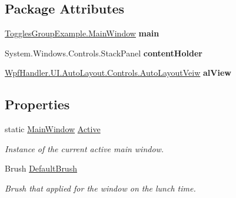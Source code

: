 \subsection*{Package Attributes}
\begin{DoxyCompactItemize}
\item 
\mbox{\label{class_toggles_group_example_1_1_main_window_a460c18e30b55048a9e354ff76a9f343e}} 
\mbox{\hyperlink{class_toggles_group_example_1_1_main_window}{Toggles\+Group\+Example.\+Main\+Window}} {\bfseries main}
\item 
\mbox{\label{class_toggles_group_example_1_1_main_window_ad2a198956555df9d157bc536853b8b8f}} 
System.\+Windows.\+Controls.\+Stack\+Panel {\bfseries content\+Holder}
\item 
\mbox{\label{class_toggles_group_example_1_1_main_window_af18d33079f92ae90c46e6f7fe9e27522}} 
\mbox{\hyperlink{class_wpf_handler_1_1_u_i_1_1_auto_layout_1_1_controls_1_1_auto_layout_veiw}{Wpf\+Handler.\+U\+I.\+Auto\+Layout.\+Controls.\+Auto\+Layout\+Veiw}} {\bfseries al\+View}
\end{DoxyCompactItemize}
\subsection*{Properties}
\begin{DoxyCompactItemize}
\item 
static \mbox{\hyperlink{class_toggles_group_example_1_1_main_window}{Main\+Window}} \mbox{\hyperlink{class_toggles_group_example_1_1_main_window_a3ed28c3d663cb4fff960655ad25170d0}{Active}}
\begin{DoxyCompactList}\small\item\em Instance of the current active main window. \end{DoxyCompactList}\item 
Brush \mbox{\hyperlink{class_toggles_group_example_1_1_main_window_a4894f43f1788b5ee0aa327596939877e}{Default\+Brush}}
\begin{DoxyCompactList}\small\item\em Brush that applied for the window on the lunch time. \end{DoxyCompactList}\end{DoxyCompactItemize}
